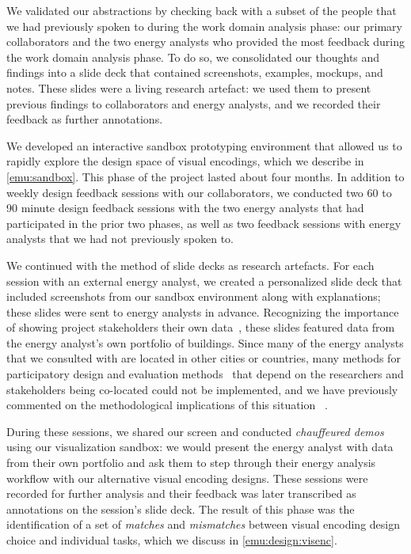 We validated our abstractions by checking back with a subset of the people that we had previously spoken to during the work domain analysis phase: our primary collaborators and the two energy analysts who provided the most feedback during the work domain analysis phase. 
To do so, we consolidated our thoughts and findings into a slide deck that contained screenshots, examples, mockups, and notes. 
These slides were a living research artefact: we used them to present previous findings to collaborators and energy analysts, and we recorded their feedback as further annotations.

We developed an interactive sandbox prototyping environment that allowed us to rapidly explore the design space of visual encodings, which we describe in \autoref{emu:sandbox}. 
This phase of the project lasted about four months.
In addition to weekly design feedback sessions with our collaborators, we conducted two 60 to 90 minute design feedback sessions with the two energy analysts that had participated in the prior two phases, as well as two feedback sessions with energy analysts that we had not previously spoken to.

We continued with the method of slide decks as research artefacts. 
For each session with an external energy analyst, we created a personalized slide deck that included screenshots from our sandbox environment along with explanations; these slides were sent to energy analysts in advance.
Recognizing the importance of showing project stakeholders their own data~\cite{Lloyd2011}, these slides featured data from the energy analyst's own portfolio of buildings.
Since many of the energy analysts that we consulted with are located in other cities or countries, many methods for participatory design and evaluation methods~\cite{Goodwin2013,McKenna2014} that depend on the researchers and stakeholders being co-located could not be implemented, and we have previously commented on  the methodological implications of this situation ~\cite{Brehmer2014a}.

During these sessions, we shared our screen and conducted {\it chauffeured demos}~\cite{Lloyd2011} using our visualization sandbox: we would present the energy analyst with data from their own portfolio and ask them to step through their energy analysis workflow with our alternative visual encoding designs.
These sessions were recorded for further analysis and their feedback was later transcribed as annotations on the session's slide deck.
The result of this phase was the identification of a set of {\it matches} and {\it mismatches} between visual encoding design choice and individual tasks, which we discuss in \autoref{emu:design:visenc}. 

